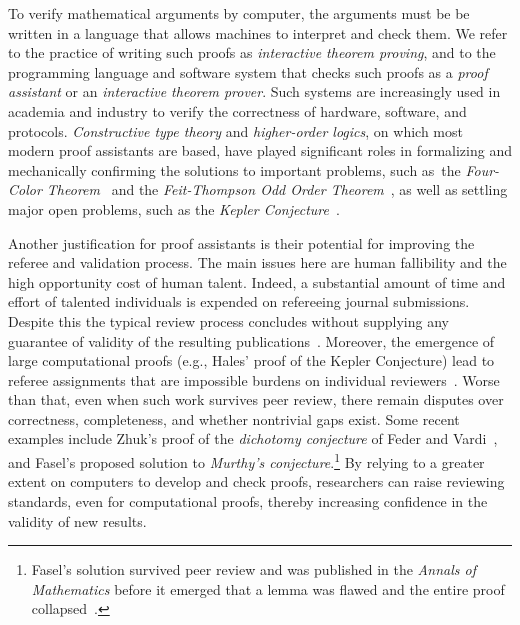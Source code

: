\documentclass[11pt]{amsart}  %
\begin{document}
To verify mathematical arguments by computer, the arguments must be be written in a language that allows machines to interpret and check them. We refer to the practice of writing such proofs as \emph{interactive theorem proving}, and to the programming language and software system that checks such proofs as a \emph{proof assistant} or an \emph{interactive theorem prover}.  Such systems are increasingly used in academia and industry to verify the correctness of hardware, software, and protocols. \emph{Constructive type theory} and \emph{higher-order logics}, on which most modern proof assistants are based, have played significant roles in formalizing and mechanically confirming the solutions to important problems, such as~the \emph{Four-Color Theorem}~\cite{MR2463991} 
and the \emph{Feit-Thompson Odd Order Theorem}~\cite{gonthier:2013b}, as well as settling major open problems, such as the \emph{Kepler Conjecture}~\cite{MR3659768}.

Another justification for proof assistants is their potential for improving the referee and validation process.  The main issues here are human fallibility and the high opportunity cost of human talent. Indeed, a substantial amount of time and effort of talented individuals is expended on refereeing journal submissions. Despite this the typical review process concludes without supplying any guarantee of validity of the resulting publications~\cite{fasel:2017}.
Moreover, the emergence of large computational proofs (e.g., Hales' proof of the Kepler Conjecture) lead to referee assignments that are impossible burdens on individual reviewers~\cite{heule:2017}. Worse than that, even when such work survives peer review, there remain disputes over correctness, completeness, and whether nontrivial gaps exist. Some recent examples include %
Zhuk's proof of the \emph{\csp dichotomy conjecture} of Feder and 
Vardi~\cite{zhuk:2017}, and Fasel's proposed solution to 
  \emph{Murthy's conjecture}.\footnote{Fasel's solution survived peer review 
  and was published in the \emph{Annals of Mathematics} before it emerged that a lemma was flawed and the entire proof collapsed~\cite{fasel:2017}.} 
By relying to a greater extent on computers to develop and check proofs, researchers can raise reviewing standards, even for computational proofs, thereby increasing confidence in the validity of new results. 

\end{document}
